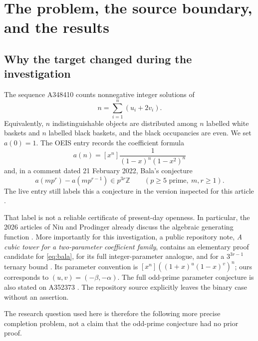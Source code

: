 \documentclass[11pt,a4paper]{article}
\numberwithin{equation}{section}
\theoremstyle{definition}
\theoremstyle{remark}
\newcommand{\Z}{\mathbb Z}
\begin{document}
\begingroup
\small
\setlength{\parskip}{0pt}
\tableofcontents
\endgroup
\clearpage

\section{The problem, the source boundary, and the results}
\label{sec:intro}

\subsection{Why the target changed during the investigation}
The sequence A348410 counts nonnegative integer solutions of
\begin{equation}\label{eq:baskets}
 n=\sum_{i=1}^n (u_i+2v_i).
\end{equation}
Equivalently, $n$ indistinguishable objects are distributed among $n$ labelled
white baskets and $n$ labelled black baskets, and the black occupancies are
even. We set $a(0)=1$. The OEIS entry records the coefficient formula
\begin{equation}\label{eq:an}
 a(n)=[x^n]\frac1{(1-x)^n(1-x^2)^n}
\end{equation}
and, in a comment dated 21 February 2022, Bala's conjecture
\begin{equation}\label{eq:bala}
 a(mp^r)-a(mp^{r-1})\in p^{3r}\Z
 \qquad(p\ge5\text{ prime},\ m,r\ge1).
\end{equation}
The live entry still labels this a conjecture in the version inspected for
this article \cite{oeis348410}.

That label is not a reliable certificate of present-day openness. In
particular, the 2026 articles of Niu and Prodinger already discuss the
algebraic generating function \cite{niu,prodinger}. More importantly for
this investigation, a public repository note, \emph{A cubic tower for a
two-parameter coefficient family}, contains an elementary proof candidate
for \eqref{eq:bala}, for its full integer-parameter analogue, and for a
$3^{3r-1}$ ternary bound \cite{prior}. Its parameter convention is
$[x^n]((1+x)^u(1-x)^v)^n$; ours corresponds to $(u,v)=(-\beta,-\alpha)$.
The full odd-prime parameter conjecture is also stated on A352373
\cite{oeis352373}. The repository source explicitly leaves the binary case
without an assertion.

The research question used here is therefore the following more precise
completion problem, not a claim that the odd-prime conjecture had no prior
proof.
\end{document}
